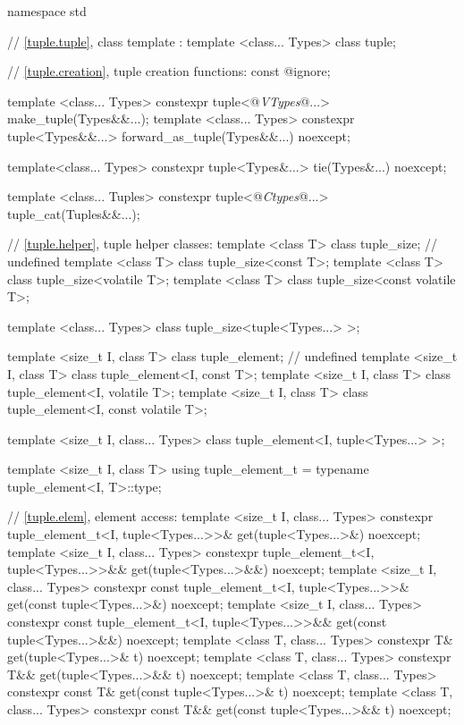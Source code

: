 %
\begin{codeblock}
namespace std {
  // \ref{tuple.tuple}, class template :
  template <class... Types> class tuple;

  // \ref{tuple.creation}, tuple creation functions:
  const @\unspec@ ignore;

  template <class... Types>
    constexpr tuple<@\textit{VTypes}@...> make_tuple(Types&&...);
  template <class... Types>
    constexpr tuple<Types&&...> forward_as_tuple(Types&&...) noexcept;

  template<class... Types>
    constexpr tuple<Types&...> tie(Types&...) noexcept;

  template <class... Tuples>
    constexpr tuple<@\textit{Ctypes}@...> tuple_cat(Tuples&&...);

  // \ref{tuple.helper}, tuple helper classes:
  template <class T> class tuple_size;  // undefined
  template <class T> class tuple_size<const T>;
  template <class T> class tuple_size<volatile T>;
  template <class T> class tuple_size<const volatile T>;

  template <class... Types> class tuple_size<tuple<Types...> >;

  template <size_t I, class T> class tuple_element;    // undefined
  template <size_t I, class T> class tuple_element<I, const T>;
  template <size_t I, class T> class tuple_element<I, volatile T>;
  template <size_t I, class T> class tuple_element<I, const volatile T>;

  template <size_t I, class... Types> class tuple_element<I, tuple<Types...> >;

  template <size_t I, class T>
    using tuple_element_t = typename tuple_element<I, T>::type;

  // \ref{tuple.elem}, element access:
  template <size_t I, class... Types>
    constexpr tuple_element_t<I, tuple<Types...>>&
      get(tuple<Types...>&) noexcept;
  template <size_t I, class... Types>
    constexpr tuple_element_t<I, tuple<Types...>>&&
      get(tuple<Types...>&&) noexcept;
  template <size_t I, class... Types>
    constexpr const tuple_element_t<I, tuple<Types...>>&
      get(const tuple<Types...>&) noexcept;
  template <size_t I, class... Types>
    constexpr const tuple_element_t<I, tuple<Types...>>&&
      get(const tuple<Types...>&&) noexcept;
  template <class T, class... Types>
    constexpr T& get(tuple<Types...>& t) noexcept;
  template <class T, class... Types>
    constexpr T&& get(tuple<Types...>&& t) noexcept;
  template <class T, class... Types>
    constexpr const T& get(const tuple<Types...>& t) noexcept;
  template <class T, class... Types>
    constexpr const T&& get(const tuple<Types...>&& t) noexcept;

}
\end{codeblock}

